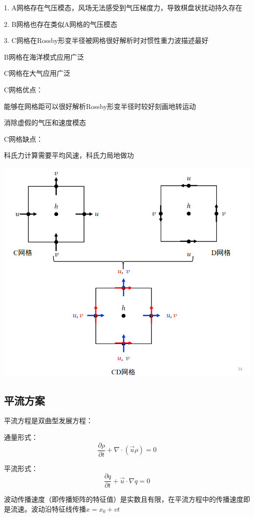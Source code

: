 \documentclass{article}
\begin{document}
1. A网格存在气压模态，风场无法感受到气压梯度力，导致棋盘状扰动持久存在

2. B网格也存在类似A网格的气压模态

3. C网格在Rossby形变半径被网格很好解析时对惯性重力波描述最好

B网格在海洋模式应用广泛

C网格在大气应用广泛

C网格优点：

能够在网格距可以很好解析Rossby形变半径时较好刻画地转运动

消除虚假的气压和速度模态

C网格缺点：

科氏力计算需要平均风速，科氏力局地做功

\begin{center}
        \includegraphics[width=\linewidth]{Fig3_4.png}
\end{center}

\subsection{平流方案}
平流方程是双曲型发展方程：

通量形式：
$$\frac{\partial \rho}{\partial t} + \nabla\cdot(\vec{u}\rho)=0$$

平流形式：
$$\frac{\partial q}{\partial t} +\vec{u} \cdot\nabla q=0$$

波动传播速度（即传播矩阵的特征值）是实数且有限，在平流方程中的传播速度即是流速。波动沿特征线传播$x=x_0+vt$
\end{document}
